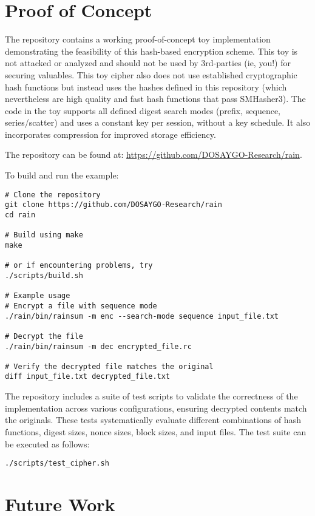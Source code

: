 \documentclass[11pt,a4paper]{article}
\begin{document}
\section*{Proof of Concept}

The repository contains a working proof-of-concept toy implementation demonstrating the feasibility of this hash-based encryption scheme. This toy is not attacked or analyzed and should not be used by 3rd-parties (ie, you!) for securing valuables. This toy cipher also does not use established cryptographic hash functions but instead uses the hashes defined in this repository (which nevertheless are high quality and fast hash functions that pass SMHasher3). The code in the toy supports all defined digest search modes (prefix, sequence, series/scatter) and uses a constant key per session, without a key schedule. It also incorporates compression for improved storage efficiency.

The repository can be found at: \url{https://github.com/DOSAYGO-Research/rain}.

To build and run the example:
\begin{verbatim}
# Clone the repository
git clone https://github.com/DOSAYGO-Research/rain
cd rain

# Build using make
make

# or if encountering problems, try
./scripts/build.sh 

# Example usage
# Encrypt a file with sequence mode
./rain/bin/rainsum -m enc --search-mode sequence input_file.txt

# Decrypt the file
./rain/bin/rainsum -m dec encrypted_file.rc

# Verify the decrypted file matches the original
diff input_file.txt decrypted_file.txt
\end{verbatim}

The repository includes a suite of test scripts to validate the correctness of the implementation across various configurations, ensuring decrypted contents match the originals. These tests systematically evaluate different combinations of hash functions, digest sizes, nonce sizes, block sizes, and input files. The test suite can be executed as follows:
\begin{verbatim}
./scripts/test_cipher.sh
\end{verbatim}

\section*{Future Work}
\end{document}

